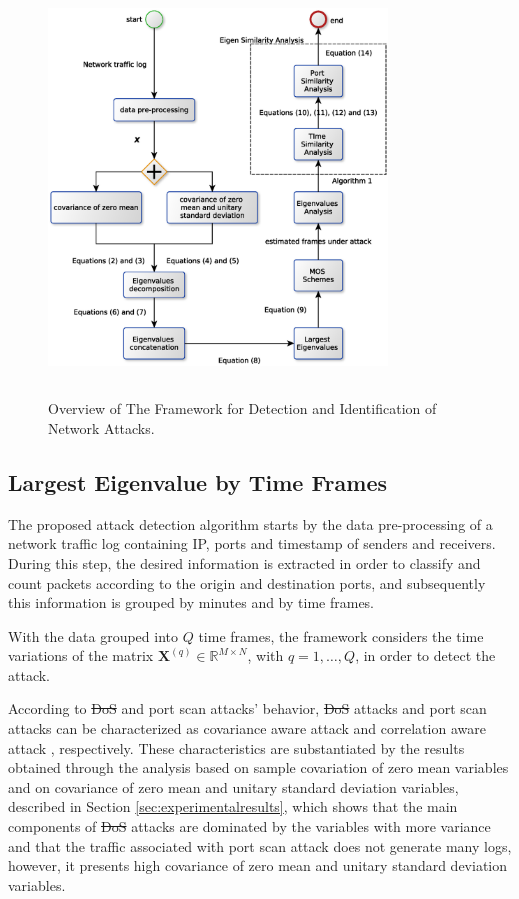 \documentclass[review]{elsarticle}
\providecommand{\DIFaddtex}[1]{{\protect\color{blue}\uwave{#1}}} %
\providecommand{\DIFdeltex}[1]{{\protect\color{red}\sout{#1}}}                      %
\providecommand{\DIFaddbegin}{} %
\providecommand{\DIFaddend}{} %
\providecommand{\DIFdelbegin}{} %
\providecommand{\DIFdelend}{} %
\providecommand{\DIFadd}[1]{\texorpdfstring{\DIFaddtex{#1}}{#1}} %
\providecommand{\DIFdel}[1]{\texorpdfstring{\DIFdeltex{#1}}{}} %
\begin{document}
\begin{figure}[h!]
	\centering
     \includegraphics[height=11cm, width=9cm]{results/figures/mos_eigen_similarity.eps}
     \caption{Overview of The Framework for Detection and Identification of Network Attacks.}
     \label{fig:fig80}
\end{figure}

\subsection{Largest Eigenvalue by Time Frames}
\label{sec:prop_LargestEigenvaluebyTimeFrames}

The proposed attack detection algorithm starts by the data pre-processing of a network traffic log containing IP, ports and timestamp of senders and receivers. During this step, the desired information is extracted in order to classify and count packets according to the origin and destination ports, and subsequently this information is grouped by minutes and by time frames.

With the data grouped into $Q$ time frames, the framework considers the time variations of the matrix $\boldsymbol{X}^{(q)} \in \mathbb{R}^{M\times{N}}$, with $q = 1, \ldots, Q$, in order to detect the attack. 

According to \DIFdelbegin \DIFdel{DoS }\DIFdelend \DIFaddbegin \DIFadd{flood }\DIFaddend and port scan attacks' behavior, \DIFdelbegin \DIFdel{DoS }\DIFdelend \DIFaddbegin \DIFadd{flood }\DIFaddend attacks and port scan attacks can be characterized as covariance aware attack \citep{jin2004covariance} and correlation aware attack \citep{lakhina2005mining}, respectively. These characteristics are substantiated by the results obtained through the analysis based on sample covariation of zero mean variables and on covariance of zero mean and unitary standard deviation variables, described in Section \ref{sec:experimentalresults}, which shows that the main components of \DIFdelbegin \DIFdel{DoS }\DIFdelend \DIFaddbegin \DIFadd{flood }\DIFaddend attacks are dominated by the variables with more variance and that the traffic associated with port scan attack does not generate many logs, however, it presents high covariance of zero mean and unitary standard deviation variables.
\end{document}
